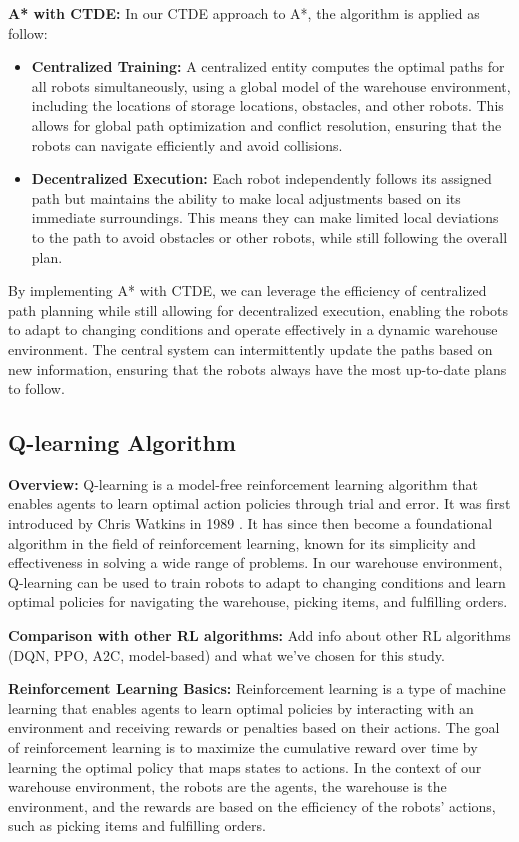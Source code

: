 \documentclass{kththesis}
\begin{document}
\textbf{A* with CTDE:}
In our CTDE approach to A*, the algorithm is applied as follow:

\begin{itemize}
    \item \textbf{Centralized Training:} A centralized entity computes the optimal paths for all robots simultaneously, using a global model of the warehouse environment, including the locations of storage locations, obstacles, and other robots. This allows for global path optimization and conflict resolution, ensuring that the robots can navigate efficiently and avoid collisions.
    \item \textbf{Decentralized Execution:} Each robot independently follows its assigned path but maintains the ability to make local adjustments based on its immediate surroundings. This means they can make limited local deviations to the path to avoid obstacles or other robots, while still following the overall plan. 
\end{itemize}

By implementing A* with CTDE, we can leverage the efficiency of centralized path planning while still allowing for decentralized execution, enabling the robots to adapt to changing conditions and operate effectively in a dynamic warehouse environment. The central system can intermittently update the paths based on new information, ensuring that the robots always have the most up-to-date plans to follow.

\subsection{Q-learning Algorithm}

\textbf{Overview:}
Q-learning is a model-free reinforcement learning algorithm that enables agents to learn optimal action policies through trial and error. It was first introduced by Chris Watkins in 1989 \parencite{Watkins89}. It has since then become a foundational algorithm in the field of reinforcement learning, known for its simplicity and effectiveness in solving a wide range of problems. In our warehouse environment, Q-learning can be used to train robots to adapt to changing conditions and learn optimal policies for navigating the warehouse, picking items, and fulfilling orders.

\textbf{Comparison with other RL algorithms:}
Add info about other RL algorithms (DQN, PPO, A2C, model-based) and what we've chosen for this study.

\textbf{Reinforcement Learning Basics:}
Reinforcement learning is a type of machine learning that enables agents to learn optimal policies by interacting with an environment and receiving rewards or penalties based on their actions. The goal of reinforcement learning is to maximize the cumulative reward over time by learning the optimal policy that maps states to actions. In the context of our warehouse environment, the robots are the agents, the warehouse is the environment, and the rewards are based on the efficiency of the robots' actions, such as picking items and fulfilling orders.
\end{document}

